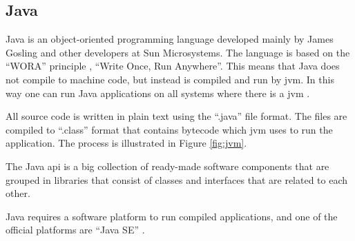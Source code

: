 \subsection{Java}

Java is an object-oriented programming language developed mainly by James Gosling and other developers at Sun Microsystems. The language is based on the ``WORA'' principle \cite{wora}, ``Write Once, Run Anywhere''. This means that Java does not compile to machine code, but instead is compiled and run by \acrfull{jvm}. In this way one can run Java applications on all systems where there is a \acrshort{jvm} \cite{java}.

All source code is written in plain text using the ``.java'' file format. The files are compiled to ``.class'' format that contains bytecode which \acrshort{jvm} uses to run the application. The process is illustrated in Figure \ref{fig:jvm}.


The Java \acrfull{api} is a big collection of ready-made software components that are grouped in libraries that consist of classes and interfaces that are related to each other.

Java requires a software platform to run compiled applications, and one of the official platforms are ``Java SE'' \cite{java}.